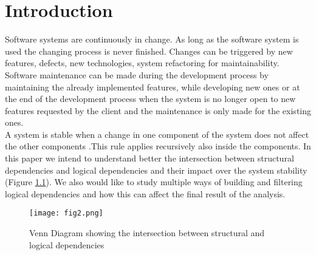 \chapter{Introduction}

\tab Software systems are continuously in change. As long as the software system is used the changing process is never ﬁnished. Changes can be triggered by new features, defects, new technologies, system refactoring for maintainability.\\ Software maintenance can be made during the development process by maintaining the already implemented features, while developing new ones or at the end of the development process when the system is no longer open to new features requested by the client and the maintenance is only made for the existing ones.\\

\tab A system is stable when a change in one component of the system does not affect the other components .This rule applies recursively also inside the components.
In this paper we intend to understand better the intersection between structural dependencies and logical dependencies and their impact over the system stability (Figure \ref{fig:fig2}). We also would like to study multiple ways of building and filtering logical dependencies and how this can affect the final result of the analysis.

\begin{figure}[h]
\centering
\texttt{[image: fig2.png]}
\caption{Venn Diagram showing the intersection between structural and logical dependencies }
\label{fig:fig2}
\end{figure}